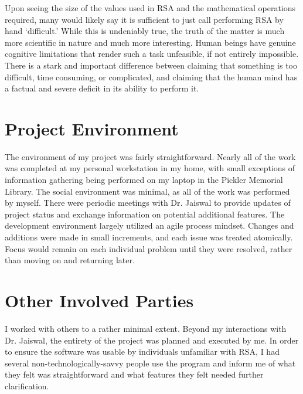 \documentclass[11pt]{article}
\begin{document}
Upon seeing the size of the values used in RSA and the mathematical operations required, many would likely say it is sufficient to just call performing RSA by hand `difficult.' While this is undeniably true, the truth of the matter is much more scientific in nature and much more interesting. Human beings have genuine cognitive limitations that render such a task unfeasible, if not entirely impossible. There is a stark and important difference between claiming that something is too difficult, time consuming, or complicated, and claiming that the human mind has a factual and severe deficit in its ability to perform it. 


\section{Project Environment}
The environment of my project was fairly straightforward. Nearly all of the work was completed at my personal workstation in my home, with small exceptions of information gathering being performed on my laptop in the Pickler Memorial Library. The social environment was minimal, as all of the work was performed by myself. There were periodic meetings with Dr. Jaiswal to provide updates of project status and exchange information on potential additional features. The development environment largely utilized an agile process mindset. Changes and additions were made in small increments, and each issue was treated atomically. Focus would remain on each individual problem until they were resolved, rather than moving on and returning later.

\section{Other Involved Parties}
I worked with others to a rather minimal extent. Beyond my interactions with Dr. Jaiswal, the entirety of the project was planned and executed by me. In order to ensure the software was usable by individuals unfamiliar with RSA, I had several non-technologically-savvy people use the program and inform me of what they felt was straightforward and what features they felt needed further clarification.
\end{document}
